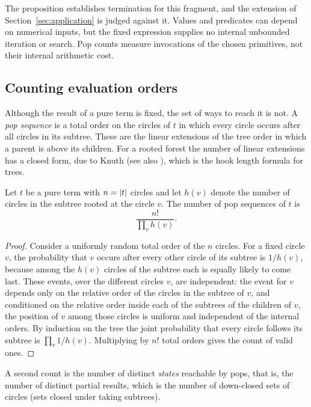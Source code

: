 The proposition establishes termination for this fragment, and the extension of Section~\ref{sec:application} is judged against it. Values and predicates can depend on numerical inputs, but the fixed expression supplies no internal unbounded iteration or search. Pop counts measure invocations of the chosen primitives, not their internal arithmetic cost.

\subsection{Counting evaluation orders}

Although the result of a pure term is fixed, the set of ways to reach it is not. A \emph{pop sequence} is a total order on the circles of $t$ in which every circle occurs after all circles in its subtree. These are the linear extensions of the tree order in which a parent is above its children. For a rooted forest the number of linear extensions has a closed form, due to Knuth \cite{knuth} (see also \cite{stanley}), which is the hook length formula for trees.

\begin{theorem}\label{thm:hook}
Let $t$ be a pure term with $n=\lvert t\rvert$ circles and let $h(v)$ denote the number of circles in the subtree rooted at the circle $v$. The number of pop sequences of $t$ is
\[
\frac{n!}{\prod_{v} h(v)}.
\]
\end{theorem}

\begin{proof}
Consider a uniformly random total order of the $n$ circles. For a fixed circle $v$, the probability that $v$ occurs after every other circle of its subtree is $1/h(v)$, because among the $h(v)$ circles of the subtree each is equally likely to come last. These events, over the different circles $v$, are independent: the event for $v$ depends only on the relative order of the circles in the subtree of $v$, and conditioned on the relative order inside each of the subtrees of the children of $v$, the position of $v$ among those circles is uniform and independent of the internal orders. By induction on the tree the joint probability that every circle follows its subtree is $\prod_v 1/h(v)$. Multiplying by $n!$ total orders gives the count of valid ones.
\end{proof}

A second count is the number of distinct \emph{states} reachable by pops, that is, the number of distinct partial results, which is the number of down-closed sets of circles (sets closed under taking subtrees).

